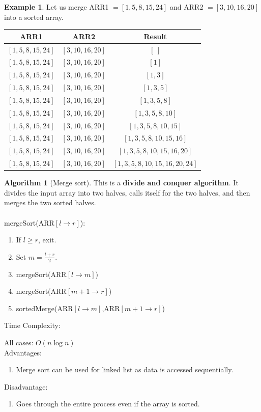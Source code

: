 \documentclass[10pt, a4paper]{extarticle}
\theoremstyle{definition}
\newtheorem{alg}{Algorithm}
\newtheorem{eg}{Example}
\begin{document}
	\begin{eg}
		Let us merge ARR1 $=[1,5,8,15,24]$ and ARR2 $=[3,10,16,20]$ into a sorted array.
		\begin{center}
		\begin{tabular}{|c|c|c|}
			\hline
			ARR1&ARR2&Result\\
			\hline
			$[\boxed{1},5,8,15,24]$&$[\boxed{3},10,16,20]$&$[\ ]$\\
			\hline
			$[1,\boxed{5},8,15,24]$&$[\boxed{3},10,16,20]$&$[1]$\\
			\hline
			$[1,\boxed{5},8,15,24]$&$[3,\boxed{10},16,20]$&$[1,3]$\\
			\hline
			$[1,5,\boxed{8},15,24]$&$[3,\boxed{10},16,20]$&$[1,3,5]$\\
			\hline
			$[1,5,8,\boxed{15},24]$&$[3,\boxed{10},16,20]$&$[1,3,5,8]$\\
			\hline
			$[1,5,8,\boxed{15},24]$&$[3,10,\boxed{16},20]$&$[1,3,5,8,10]$\\
			\hline
			$[1,5,8,15,\boxed{24}]$&$[3,10,\boxed{16},20]$&$[1,3,5,8,10,15]$\\
			\hline
			$[1,5,8,15,\boxed{24}]$&$[3,10,16,\boxed{20}]$&$[1,3,5,8,10,15,16]$\\
			\hline
			$[1,5,8,15,\boxed{24}]$&$[3,10,16,20]$&$[1,3,5,8,10,15,16,20]$\\
			\hline
			$[1,5,8,15,24]$&$[3,10,16,20]$&$[1,3,5,8,10,15,16,20,24]$\\
			\hline


		\end{tabular}
	\end{center}
	\end{eg}
	\begin{alg}[Merge sort]
		This is a \textbf{divide and conquer algorithm}. It divides the input array into two halves, calls itself for the two halves, and then merges the two sorted halves.\\ \\
		mergeSort(ARR$[l\to r]$):
		\begin{enumerate}
			\item If $l\geq r$, exit.
			\item Set $m=\frac{l+r}{2}$.
			\item mergeSort(ARR$[l\to m]$)
			\item mergeSort(ARR$[m+1\to r]$)
			\item sortedMerge(ARR$[l\to m]$,ARR$[m+1\to r]$)
	\end{enumerate}
	Time Complexity:

	All cases: $O(n\log n)$
	\hfill\\
	Advantages:
	\begin{enumerate}
		\item Merge sort can be used for linked list as data is accessed sequentially.
\end{enumerate}
	Disadvantage:
	\begin{enumerate}
		\item Goes through the entire process even if the array is sorted.
\end{enumerate}
	\end{alg}
\end{document}
